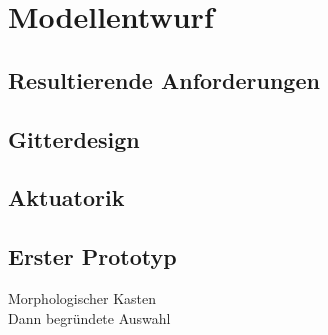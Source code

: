 \chapter{Modellentwurf}

\section{Resultierende Anforderungen}

\section{Gitterdesign}

\section{Aktuatorik}

\section{Erster Prototyp}
Morphologischer Kasten\\
Dann begründete Auswahl